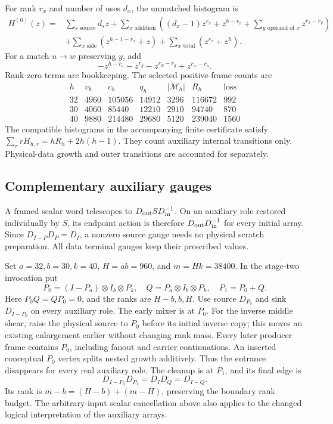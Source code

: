For rank $r_x$ and number of uses $d_x$, the unmatched histogram is
\begin{align*}
 H^{(0)}(z)={}&\sum_{s\text{ source}}d_sz
 +\sum_{x\text{ addition}}\left((d_x-1)z^{r_x}+z^{h-r_x}
                  +\sum_{y\text{ operand of }x}z^{r_x-r_y}\right)\\
 &+\sum_{x\text{ side}}(z^{h-1-r_x}+z)
 +\sum_{x\text{ total}}(z^{r_x}+z^h).
\end{align*}
For a match $u\to w$ preserving $y$, add
\[
 -z^{h-r_u}-z^{r_y}-z^{r_w-r_y}+z^{r_w-r_u}.
\]
Rank-zero terms are bookkeeping. The selected positive-frame counts are
\[
\begin{array}{c|rrrrrr}
 h&v_h&c_h&q_h&|\mathcal M_h|&R_h&\text{loss}\\\hline
32&4960&105056&14912&3296&116672&992\\
30&4060&85440&12210&2910&94740&870\\
40&9880&214480&29680&5120&239040&1560
\end{array}
\]
The compatible histograms in the accompanying finite certificate satisfy
$\sum_r rH_{h,r}=hR_h+2h(h-1)$. They count auxiliary internal transitions
only. Physical-data growth and outer transitions are accounted for separately.

\subsection{Complementary auxiliary gauges}
A framed scalar word telescopes to $D_{\rm out}S D_{\rm in}^{-1}$.
On an auxiliary role restored individually by $S$, its endpoint action is
therefore $D_{\rm out}D_{\rm in}^{-1}$ for every initial array.
Since $D_{I-P}D_P=D_I$, a nonzero source gauge needs no physical scratch
preparation. All data terminal gauges keep their prescribed values.

Set $a=32,b=30,k=40$, $H=ab=960$, and $m=Hk=38400$.
In the stage-two invocation put
\[
 P_0=(I-P_a)\otimes I_b\otimes P_k,\quad
 Q=P_a\otimes I_b\otimes P_k,\quad P_1=P_0+Q.
\]
Here $P_0Q=QP_0=0$, and the ranks are $H-b,b,H$.
Use source $D_{P_0}$ and sink $D_{I-P_0}$ on every auxiliary role.
The early mixer is at $P_0$. For the inverse middle shear, raise the
physical source to $P_0$ before its initial inverse copy; this moves an
existing enlargement earlier without changing rank mass. Every later
producer frame contains $P_0$, including fanout and carrier continuations.
An inserted conceptual $P_0$ vertex splits nested growth additively.
Thus the entrance disappears for every real auxiliary role. The cleanup
is at $P_1$, and its final edge is
\[
 D_{I-P_0}D_{P_1}=D_I D_Q=D_{I-Q}.
\]
Its rank is $m-b=(H-b)+(m-H)$, preserving the boundary rank budget.
The arbitrary-input scalar cancellation above also applies to the changed
logical interpretation of the auxiliary arrays.


